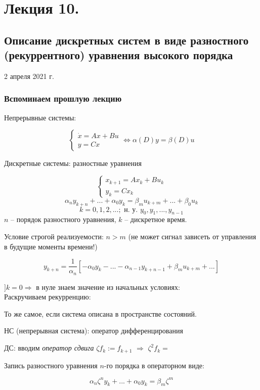 \documentclass[main.tex]{subfiles}
\begin{document}
\section{ Лекция 10.  }
\subsection{ Описание дискретных систем в виде разностного (рекуррентного) уравнения высокого порядка }
2 апреля 2021 г.

\subsubsection{ Вспоминаем прошлую лекцию }

Непрерывные системы:

$$ \begin{cases}
\dot x = Ax + Bu \\
y = Cx
\end{cases} \Leftrightarrow \alpha(D) y = \beta(D) u $$

Дискретные системы: разностные уравнения

$$ \begin{cases}
x_{k+1} = A x_k + B u_k \\
y_k = C x_k
\end{cases} $$
\[ \alpha_n y_{k+n} + ... + \alpha_0 y_k = \beta_m u_{k+m} + ... + \beta_0 u_k \]
\[ k = 0, 1, 2, ...; \text{ н. у. } y_0, y_1, ..., y_{n-1} \]
$ n $ -- порядок разностного уравнения, $ k $ -- дискретное время.

Условие строгой реализуемости: $ \boxed{ n > m } $ (не может сигнал зависеть от управления в будущие моменты времени!)

\[ y_{k+n} = \frac{1}{\alpha_n} \left[ - \alpha_0 y_k - ... - \alpha_{n-1} y_{k+n-1} + \beta_m u_{k+m} + ... \right] \]

$ ] k = 0 \Rightarrow $ в нуле знаем значение из начальных условиях:
\[  \] %
Раскручиваем рекурренцию:

То же самое, если система описана в пространстве состояний.

НС (непрерывная система): оператор дифференцирования
 
ДС: вводим \emph{ оператор сдвига } $ \zeta f_k := f_{k+1} $ $ \Rightarrow $ $ \zeta^2 f_k = $ %

Запись разностного уравнения $n$-го порядка в операторном виде:

\[ \alpha_n \zeta^n y_k + ... + \alpha_0 y_k = \beta_m \zeta^m \] %
\end{document}
